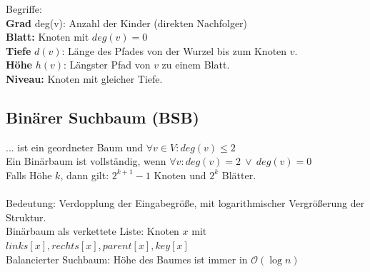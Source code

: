 \documentclass[fs, footer]{latex4ei}
\begin{document}
\begin{multicols*}{4}
{{Begriffe:\\
\textbf{Grad} deg(v): Anzahl der Kinder (direkten Nachfolger)\\
\textbf{Blatt:} Knoten mit $deg(v) = 0$\\
\textbf{Tiefe} $d(v)$: Länge des Pfades von der Wurzel bis zum Knoten $v$.\\ 
\textbf{Höhe} $h(v)$: Längster Pfad von $v$ zu einem Blatt.\\   
\textbf{Niveau:} Knoten mit gleicher Tiefe.\\

\subsection{Binärer Suchbaum (BSB)}
... ist ein geordneter Baum und $\forall v \in V:deg(v) \le 2$\\
Ein Binärbaum ist vollständig, wenn $\forall v: deg(v) = 2 \ \lor \ deg(v)=0$\\ 
Falls Höhe $k$, dann gilt: $2^{k+1} - 1$ Knoten und $2^k$ Blätter.\\ 
\\
Bedeutung: Verdopplung der Eingabegröße, mit logarithmischer Vergrößerung der Struktur.\\
Binärbaum als verkettete Liste: Knoten $x$ mit $links[x],rechts[x], parent[x], key[x]$\\

Balancierter Suchbaum: Höhe des Baumes ist immer in $\mathcal O(\log n)$\\
}}
\end{multicols*}
\end{document}
